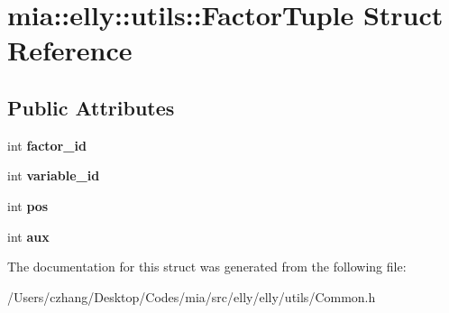 \hypertarget{structmia_1_1elly_1_1utils_1_1_factor_tuple}{\section{mia\-:\-:elly\-:\-:utils\-:\-:Factor\-Tuple Struct Reference}
\label{structmia_1_1elly_1_1utils_1_1_factor_tuple}
}
\subsection*{Public Attributes}
\begin{DoxyCompactItemize}
\item 
\hypertarget{structmia_1_1elly_1_1utils_1_1_factor_tuple_a6ac34976c6a9f09302811418be276918}{int {\bfseries factor\-\_\-id}}\label{structmia_1_1elly_1_1utils_1_1_factor_tuple_a6ac34976c6a9f09302811418be276918}

\item 
\hypertarget{structmia_1_1elly_1_1utils_1_1_factor_tuple_a9508c76cec185c05d436cbc92e473155}{int {\bfseries variable\-\_\-id}}\label{structmia_1_1elly_1_1utils_1_1_factor_tuple_a9508c76cec185c05d436cbc92e473155}

\item 
\hypertarget{structmia_1_1elly_1_1utils_1_1_factor_tuple_a5f6a90de690c411850aee354c15776c7}{int {\bfseries pos}}\label{structmia_1_1elly_1_1utils_1_1_factor_tuple_a5f6a90de690c411850aee354c15776c7}

\item 
\hypertarget{structmia_1_1elly_1_1utils_1_1_factor_tuple_a3e51d19b5826a516c691a15be89cec5a}{int {\bfseries aux}}\label{structmia_1_1elly_1_1utils_1_1_factor_tuple_a3e51d19b5826a516c691a15be89cec5a}

\end{DoxyCompactItemize}


The documentation for this struct was generated from the following file\-:\begin{DoxyCompactItemize}
\item 
/\-Users/czhang/\-Desktop/\-Codes/mia/src/elly/elly/utils/Common.\-h\end{DoxyCompactItemize}
